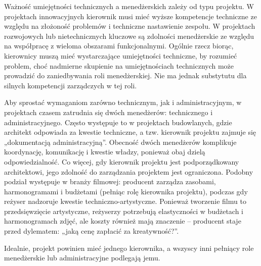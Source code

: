Ważność umiejętności technicznych a menedżerskich zależy od typu projektu. W projektach innowacyjnych kierownik musi mieć wyższe kompetencje techniczne ze względu na złożoność problemów i techniczne nastawienie zespołu. W projektach rozwojowych lub nietechnicznych kluczowe są zdolności menedżerskie ze względu na współpracę z wieloma obszarami funkcjonalnymi. Ogólnie rzecz biorąc, kierownicy muszą mieć wystarczające umiejętności techniczne, by rozumieć problem, choć nadmierne skupienie na umiejętnościach technicznych może prowadzić do zaniedbywania roli menedżerskiej. Nie ma jednak substytutu dla silnych kompetencji zarządczych w tej roli.

Aby sprostać wymaganiom zarówno technicznym, jak i administracyjnym, w projektach czasem zatrudnia się dwóch menedżerów: technicznego i administracyjnego. Często występuje to w projektach budowlanych, gdzie architekt odpowiada za kwestie techniczne, a tzw. kierownik projektu zajmuje się „dokumentacją administracyjną”. Obecność dwóch menedżerów komplikuje koordynację, komunikację i kwestie władzy, ponieważ obaj dzielą odpowiedzialność. Co więcej, gdy kierownik projektu jest podporządkowany architektowi, jego zdolność do zarządzania projektem jest ograniczona. Podobny podział występuje w branży filmowej: producent zarządza zasobami, harmonogramami i budżetami (pełniąc rolę kierownika projektu), podczas gdy reżyser nadzoruje kwestie techniczno-artystyczne. Ponieważ tworzenie filmu to przedsięwzięcie artystyczne, reżyserzy potrzebują elastyczności w budżetach i harmonogramach zdjęć, ale koszty również mają znaczenie – producent staje przed dylematem: „jaką cenę zapłacić za kreatywność?”.

Idealnie, projekt powinien mieć jednego kierownika, a wszyscy inni pełniący role menedżerskie lub administracyjne podlegają jemu.\autocite{NicholasSteyn}